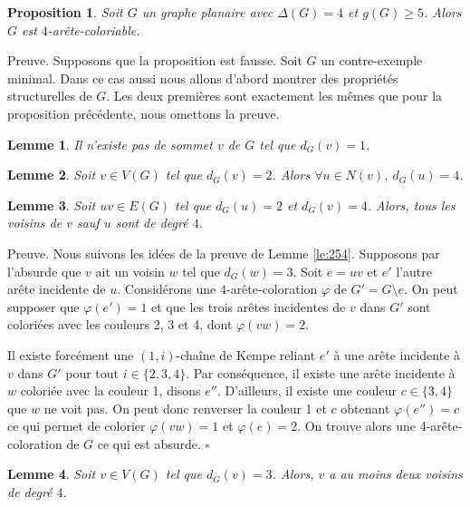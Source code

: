 \documentclass[10pt,a4paper]{article}
\newtheorem{proposition}{Proposition}
\newtheorem{lemme}{Lemme}
\newcommand{\ep}{{\hfill $\square$}}
\begin{document}
\begin{proposition}
Soit $G$ un graphe planaire avec $\Delta(G) = 4$ et $g(G) \geq 5$. Alors $G$ est $4$-arête-coloriable.
\label{prop:454}
\end{proposition}

Preuve. Supposons que la proposition est fausse. Soit $G$ un contre-exemple minimal. Dans ce cas aussi nous allons d'abord montrer des propriétés structurelles de $G$. Les deux premières sont exactement les mêmes que pour la proposition précédente, nous omettons la preuve.

\begin{lemme}
Il n'existe pas de sommet $v$ de $G$ tel que $d_G(v) = 1$.
\label{le:14}
\end{lemme}

\begin{lemme}
Soit $v \in V(G)$ tel que $d_G(v) = 2$. Alors $\forall u \in N(v)$, $d_G(u) = 4$.
\label{le:23}
\end{lemme} 


\begin{lemme}
Soit $uv \in E(G)$ tel que $d_G(u) = 2$ et $d_G(v) = 4$. Alors, tous les voisins de $v$ sauf $u$ sont de degré $4$.
\label{le:243}
\end{lemme}

Preuve. Nous suivons les idées de la preuve de Lemme \ref{le:254}.
Supposons par l'absurde que $v$ ait un voisin $w$ tel que $d_G(w) = 3$. Soit $e = uv$ et $e'$ l'autre arête incidente de $u$. Considérons une $4$-arête-coloration $\varphi$ de $G' = G \setminus e$. On peut supposer que $\varphi(e') = 1$ et que les trois arêtes incidentes de $v$ dans $G'$ sont coloriées avec les couleurs 2, 3 et 4, dont $\varphi(vw) = 2$.

Il existe forcément une $(1,i)$-chaîne de Kempe reliant $e'$ à une arête incidente à $v$ dans $G'$ pour tout $i \in \{2,3,4\}$. Par conséquence, il existe une arête incidente à $w$ coloriée avec la couleur 1, disons $e''$. D'ailleurs, il existe une couleur $c\in \{3,4\}$ que $w$ ne voit pas. On peut donc renverser la couleur 1 et $c$ obtenant $\varphi(e'') = c$ ce qui permet de colorier $\varphi(vw) = 1$ et $\varphi(e) = 2$. On trouve alors une 4-arête-coloration de $G$ ce qui est absurde.
\ep

\begin{lemme}
Soit $v \in V(G)$ tel que $d_G(v)=3$. Alors, $v$ a au moins deux voisins de degré $4$.
\label{le:333}
\end{lemme}
\end{document}
